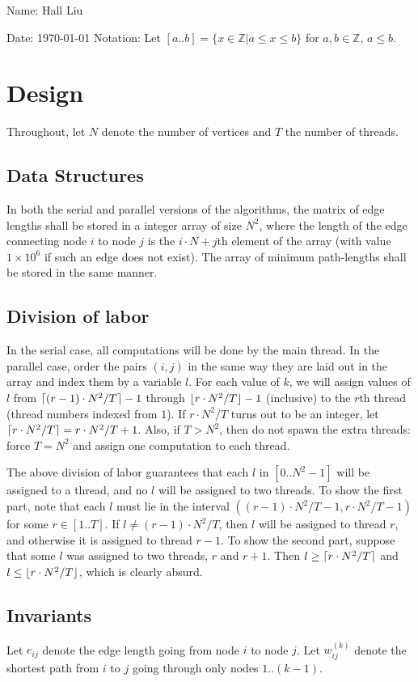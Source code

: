 \documentclass{article}
\newcommand{\zn}{\mathbb{Z}}
\DeclarePairedDelimiter\ceil{\lceil}{\rceil}
\DeclarePairedDelimiter\floor{\lfloor}{\rfloor}
\begin{document}
Name: Hall Liu

Date: \today 
Notation: Let $[a..b]=\{x\in\zn|a\leq x\leq b\}$ for $a,b\in\zn$, $a\leq b$.
\section*{Design}
Throughout, let $N$ denote the number of vertices and $T$ the number of threads.
\subsection*{Data Structures}
In both the serial and parallel versions of the algorithms, the matrix of edge lengths shall be stored in a integer array of size $N^2$, where the length of the edge connecting node $i$ to node $j$ is the $i\cdot N+j$th element of the array (with value $1\times10^6$ if such an edge does not exist). The array of minimum path-lengths shall be stored in the same manner. 

\subsection*{Division of labor}
In the serial case, all computations will be done by the main thread. In the parallel case, order the pairs $(i,j)$ in the same way they are laid out in the array and index them by a variable $l$. For each value of $k$, we will assign values of $l$ from $\ceil{(r-1)\cdot N^2/T}-1$ through $\floor{r\cdot N^2/T}-1$ (inclusive) to the $r$th thread (thread numbers indexed from $1$). If $r\cdot N^2/T$ turns out to be an integer, let $\ceil{r\cdot N^2/T}=r\cdot N^2/T + 1$. Also, if $T>N^2$, then do not spawn the extra threads: force $T=N^2$ and assign one computation to each thread.

The above division of labor guarantees that each $l$ in $[0..N^2-1]$ will be assigned to a thread, and no $l$ will be assigned to two threads. To show the first part, note that each $l$ must lie in the interval $((r-1)\cdot N^2/T-1, r\cdot N^2/T-1)$ for some $r\in[1..T]$. If $l\neq (r-1)\cdot N^2/T$, then $l$ will be assigned to thread $r$, and otherwise it is assigned to thread $r-1$. To show the second part, suppose that some $l$ was assigned to two threads, $r$ and $r+1$. Then $l\geq\ceil{r\cdot N^2/T}$ and $l\leq\floor{r\cdot N^2/T}$, which is clearly absurd. 
\subsection*{Invariants}
Let $e_{ij}$ denote the edge length going from node $i$ to node $j$. Let $w_{ij}^{(k)}$ denote the shortest path from $i$ to $j$ going through only nodes $1..(k-1)$. 
\end{document}
